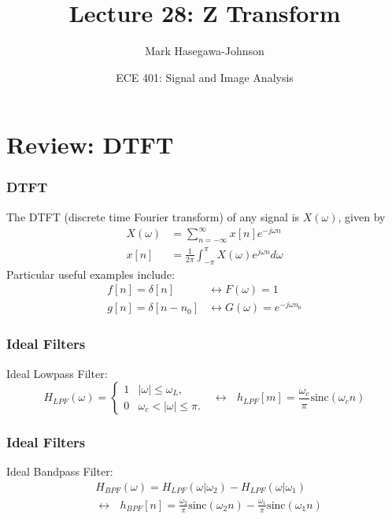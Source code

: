\documentclass{beamer}
\title{Lecture 28: Z Transform}
\author{Mark Hasegawa-Johnson}
\date{ECE 401: Signal and Image Analysis}
\begin{document}
\begin{frame}
  \maketitle
\end{frame}

\begin{frame}
  \tableofcontents
\end{frame}

\section[DTFT]{Review: DTFT}
\setcounter{subsection}{1}

\begin{frame}
  \frametitle{DTFT}

  The DTFT (discrete time Fourier transform) of any signal is
  $X(\omega)$, given by
  \begin{align*}
    X(\omega) &= \sum_{n=-\infty}^\infty x[n]e^{-j\omega n}\\
    x[n] &= \frac{1}{2\pi}\int_{-\pi}^\pi X(\omega)e^{j\omega n}d\omega
  \end{align*}
  Particular useful examples include:
  \begin{align*}
    f[n]=\delta[n] &\leftrightarrow F(\omega)=1\\
    g[n]=\delta[n-n_0] &\leftrightarrow G(\omega)=e^{-j\omega n_0}
  \end{align*}
\end{frame}

\begin{frame}
  \frametitle{Ideal Filters}
  Ideal Lowpass Filter:
  \[
  H_{LPF}(\omega)
  = \begin{cases} 1& |\omega|\le\omega_L,\\
    0 & \omega_c<|\omega|\le\pi.
  \end{cases}~~~\leftrightarrow~~~
  h_{LPF}[m]=\frac{\omega_c}{\pi}\mbox{sinc}(\omega_c n)
  \]
\end{frame}

\begin{frame}
  \frametitle{Ideal Filters}
  Ideal Bandpass Filter:
  \begin{align*}
    &H_{BPF}(\omega)=H_{LPF}(\omega|\omega_2)-H_{LPF}(\omega|\omega_1)\\
    &\leftrightarrow~~~ h_{BPF}[n]=\frac{\omega_2}{\pi}\mbox{sinc}(\omega_2 n)-
    \frac{\omega_1}{\pi}\mbox{sinc}(\omega_1 n)
  \end{align*}
\end{frame}
\end{document}
